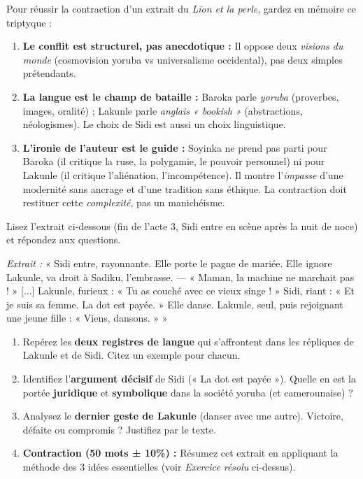 \documentclass[11pt]{article}
\begin{document}
\begin{aretenir}
Pour réussir la contraction d'un extrait du \emph{Lion et la perle}, gardez en mémoire ce triptyque :
\begin{enumerate}
    \item \textbf{Le conflit est structurel, pas anecdotique :} Il oppose deux \emph{visions du monde} (cosmovision yoruba vs universalisme occidental), pas deux simples prétendants.
    \item \textbf{La langue est le champ de bataille :} Baroka parle \emph{yoruba} (proverbes, images, oralité) ; Lakunle parle \emph{anglais « bookish »} (abstractions, néologismes). Le choix de Sidi est aussi un choix linguistique.
    \item \textbf{L'ironie de l'auteur est le guide :} Soyinka ne prend pas parti pour Baroka (il critique la ruse, la polygamie, le pouvoir personnel) ni pour Lakunle (il critique l'aliénation, l'incompétence). Il montre l'\emph{impasse} d'une modernité sans ancrage et d'une tradition sans éthique. La contraction doit restituer cette \emph{complexité}, pas un manichéisme.
\end{enumerate}
\end{aretenir}

\begin{exercice}
Lisez l'extrait ci-dessous (fin de l'acte 3, Sidi entre en scène après la nuit de noce) et répondez aux questions.

\emph{Extrait :} « Sidi entre, rayonnante. Elle porte le pagne de mariée. Elle ignore Lakunle, va droit à Sadiku, l'embrasse. — « Maman, la machine ne marchait pas ! » [...] Lakunle, furieux : « Tu as couché avec ce vieux singe ! » Sidi, riant : « Et je suis sa femme. La dot est payée. » Elle danse. Lakunle, seul, puis rejoignant une jeune fille : « Viens, dansons. » »

\begin{enumerate}
    \item Repérez les \textbf{deux registres de langue} qui s'affrontent dans les répliques de Lakunle et de Sidi. Citez un exemple pour chacun.
    \item Identifiez l'\textbf{argument décisif} de Sidi (« La dot est payée »). Quelle en est la portée \textbf{juridique} et \textbf{symbolique} dans la société yoruba (et camerounaise) ?
    \item Analysez le \textbf{dernier geste de Lakunle} (danser avec une autre). Victoire, défaite ou compromis ? Justifiez par le texte.
    \item \textbf{Contraction (50 mots ± 10\%) :} Résumez cet extrait en appliquant la méthode des 3 idées essentielles (voir \emph{Exercice résolu} ci-dessus).
\end{enumerate}
\end{exercice}
\end{document}
